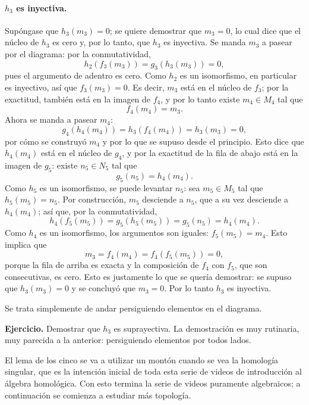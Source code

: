 \documentclass[11pt]{article}
\begin{document}
\paragraph{$h_3$ es inyectiva.} Supóngase que $h_3(m_3)=0$; se quiere demostrar que $m_3=0$, lo cual dice que el núcleo de $h_3$ es cero y, por lo tanto, que $h_3$ es inyectiva. Se manda $m_3$ a pasear por el diagrama: por la conmutatividad,
\[
  h_2(f_3(m_3))=g_3(h_3(m_3))=0,
\]
pues el argumento de adentro es cero. Como $h_2$ es un isomorfismo, en particular es inyectivo, así que $f_3(m_3)=0$. Es decir, $m_3$ está en el núcleo de $f_3$; por la exactitud, también está en la imagen de $f_4$, y por lo tanto existe $m_4\in M_4$ tal que
\[
  f_4(m_4)=m_3 .
\]
Ahora se manda a pasear $m_4$:
\[
  g_4(h_4(m_4))=h_3(f_4(m_4))=h_3(m_3)=0,
\]
por cómo se construyó $m_4$ y por lo que se supuso desde el principio. Esto dice que $h_4(m_4)$ está en el núcleo de $g_4$, y por la exactitud de la fila de abajo está en la imagen de $g_5$: existe $n_5\in N_5$ tal que
\[
  g_5(n_5)=h_4(m_4).
\]
Como $h_5$ es un isomorfismo, se puede levantar $n_5$: sea $m_5\in M_5$ tal que $h_5(m_5)=n_5$. Por construcción, $m_5$ desciende a $n_5$, que a su vez desciende a $h_4(m_4)$; así que, por la conmutatividad,
\[
  h_4(f_5(m_5))=g_5(h_5(m_5))=g_5(n_5)=h_4(m_4).
\]
Como $h_4$ es un isomorfismo, los argumentos son iguales: $f_5(m_5)=m_4$. Esto implica que
\[
  m_3=f_4(m_4)=f_4(f_5(m_5))=0,
\]
porque la fila de arriba es exacta y la composición de $f_4$ con $f_5$, que son consecutivas, es cero. Esto es justamente lo que se quería demostrar: se supuso que $h_3(m_3)=0$ y se concluyó que $m_3=0$. Por lo tanto $h_3$ es inyectiva.

Se trata simplemente de andar persiguiendo elementos en el diagrama.

\medskip\noindent\textbf{Ejercicio.} Demostrar que $h_3$ es suprayectiva. La demostración es muy rutinaria, muy parecida a la anterior: persiguiendo elementos por todos lados.

\medskip
El lema de los cinco se va a utilizar un montón cuando se vea la homología singular, que es la intención inicial de toda esta serie de videos de introducción al álgebra homológica. Con esto termina la serie de videos puramente algebraicos; a continuación se comienza a estudiar más topología.
\end{document}
